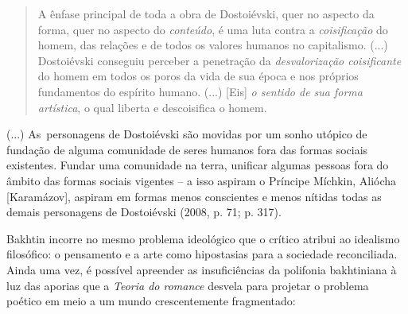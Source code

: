 {{\begin{quote}
A ênfase principal de toda a obra de Dostoiévski, quer no aspecto da
forma, quer no aspecto do \emph{conteúdo}, é uma luta contra a
\emph{coisificação} do homem, das relações e de todos os valores humanos
no capitalismo. (...) Dostoiévski conseguiu perceber a penetração da
\emph{desvalorização coisificante} do homem em todos os poros da vida de
sua época e nos próprios fundamentos do espírito humano. (...) {[}Eis{]}
\emph{o sentido de sua forma artística}, o qual liberta e descoisifica o
homem.
\end{quote}

(...) As~personagens de Dostoiévski são movidas por um sonho utópico de
fundação de alguma comunidade de seres humanos fora das formas sociais
existentes. Fundar uma comunidade na terra, unificar algumas pessoas
fora do âmbito das formas sociais vigentes -- a isso aspiram o Príncipe
Míchkin, Aliócha {[}Karamázov{]}, aspiram em formas menos conscientes e
menos nítidas todas as demais personagens de Dostoiévski (2008, p. 71;
p. 317).

Bakhtin incorre no mesmo problema ideológico que o crítico atribui ao
idealismo filosófico: o pensamento e a arte como hipostasias para a
sociedade reconciliada. Ainda uma vez, é possível apreender as
insuficiências da polifonia bakhtiniana à luz das aporias que a
\emph{Teoria do romance} desvela para projetar o problema poético em
meio a um mundo crescentemente fragmentado:

}}
